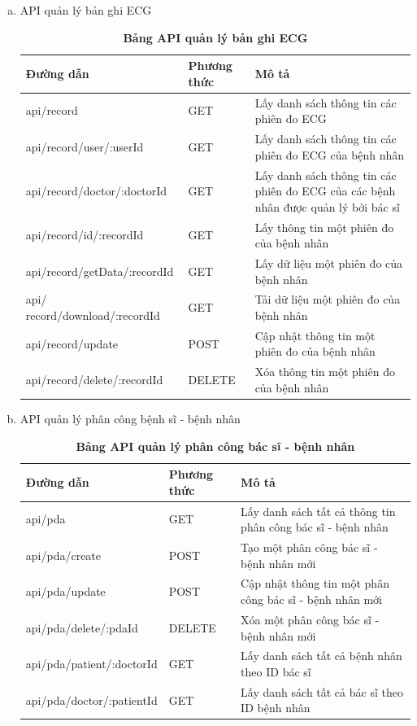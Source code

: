 \begin{enumerate}[a)]
\item API quản lý bản ghi ECG
\begin{xltabular}{\textwidth}{
  | >{\raggedright\arraybackslash}p{5cm}
  | >{\centering\arraybackslash}m{2.8cm}
  | >{\raggedright\arraybackslash}X |
  }
  \caption{\bfseries \fontsize{12pt}{0pt}\selectfont Bảng API quản lý bản ghi ECG}
  \label{table_api_ecg}
  \\
  \hline
  \bfseries Đường dẫn    &\bfseries Phương thức    &\bfseries Mô tả\\ \hline
 api/record   &   GET  & Lấy danh sách thông tin các phiên đo ECG \\ \hline
 api/record/user/:userId   &    GET    & Lấy danh sách thông tin các phiên đo ECG của bệnh nhân \\ \hline
 api/record/doctor/:doctorId &   GET     & Lấy danh sách thông tin các phiên đo ECG của các bệnh nhân được quản lý bởi bác sĩ \\ \hline
 api/record/id/:recordId  &     GET   & Lấy thông tin một phiên đo của bệnh nhân \\ \hline
 api/record/getData/:recordId  &     GET   & Lấy dữ liệu một phiên đo của bệnh nhân \\ \hline
 api/ record/download/:recordId  &     GET   & Tải dữ liệu một phiên đo của bệnh nhân \\ \hline
 api/record/update  &     POST   & Cập nhật thông tin một phiên đo của bệnh nhân \\ \hline
 api/record/delete/:recordId  &     DELETE   & Xóa thông tin một phiên đo của bệnh nhân \\ \hline
  \end{xltabular}


\item API quản lý phân công bệnh sĩ - bệnh nhân
\begin{xltabular}{\textwidth}{
  | >{\raggedright\arraybackslash}p{4.5cm}
  | >{\centering\arraybackslash}m{2.8cm}
  | >{\raggedright\arraybackslash}X |
  }
  \caption{\bfseries \fontsize{12pt}{0pt}\selectfont Bảng API quản lý phân công bác sĩ - bệnh nhân}
  \label{table_api_pda}
  \\
  \hline
  \bfseries Đường dẫn    &\bfseries Phương thức    &\bfseries Mô tả\\ \hline
  api/pda   &   GET  & Lấy danh sách tất cả thông tin phân công bác sĩ - bệnh nhân \\ \hline
  api/pda/create  &    POST    & Tạo một phân công bác sĩ - bệnh nhân mới \\ \hline
  api/pda/update  &    POST    & Cập nhật thông tin một phân công bác sĩ - bệnh nhân mới \\ \hline
  api/pda/delete/:pdaId  &    DELETE    & Xóa một phân công bác sĩ - bệnh nhân mới \\ \hline
  api/pda/patient/:doctorId &  GET  & Lấy danh sách tất cả bệnh nhân theo ID bác sĩ \\ \hline
  api/pda/doctor/:patientId &  GET  & Lấy danh sách tất cả bác sĩ theo ID bệnh nhân \\ \hline
  \end{xltabular}

\end{enumerate}




